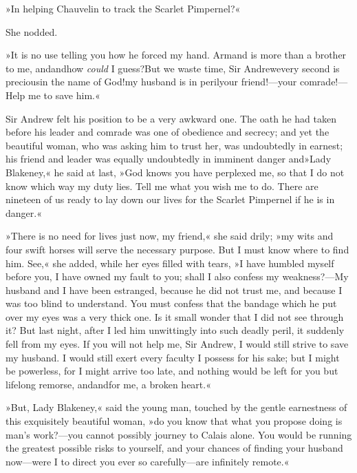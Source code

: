 »In helping Chauvelin to track the Scarlet Pimpernel?«

She nodded.

»It is no use telling you how he forced my hand. Armand is more than a brother to me, and\textellipsis \allowbreak  and\textellipsis \allowbreak  how \textit{could} I guess?\textellipsis \allowbreak  But we waste time, Sir Andrew\textellipsis \allowbreak  every second is precious\textellipsis \allowbreak  in the name of God!\textellipsis \allowbreak  my husband is in peril\textellipsis \allowbreak  your friend!—your comrade!—Help me to save him.«

Sir Andrew felt his position to be a very awkward one. The oath he had taken before his leader and comrade was one of obedience and secrecy; and yet the beautiful woman, who was asking him to trust her, was undoubtedly in earnest; his friend and leader was equally undoubtedly in imminent danger and\textellipsis \allowbreak  »Lady Blakeney,« he said at last, »God knows you have perplexed me, so that I do not know which way my duty lies. Tell me what you wish me to do. There are nineteen of us ready to lay down our lives for the Scarlet Pimpernel if he is in danger.«

»There is no need for lives just now, my friend,« she said drily; »my wits and four swift horses will serve the necessary purpose. But I must know where to find him. See,« she added, while her eyes filled with tears, »I have humbled myself before you, I have owned my fault to you; shall I also confess my weakness?—My husband and I have been estranged, because he did not trust me, and because I was too blind to understand. You must confess that the bandage which he put over my eyes was a very thick one. Is it small wonder that I did not see through it? But last night, after I led him unwittingly into such deadly peril, it suddenly fell from my eyes. If you will not help me, Sir Andrew, I would still strive to save my husband. I would still exert every faculty I possess for his sake; but I might be powerless, for I might arrive too late, and nothing would be left for you but lifelong remorse, and\textellipsis \allowbreak  and\textellipsis \allowbreak  for me, a broken heart.«

»But, Lady Blakeney,« said the young man, touched by the gentle earnestness of this exquisitely beautiful woman, »do you know that what you propose doing is man's work?—you cannot possibly journey to Calais alone. You would be running the greatest possible risks to yourself, and your chances of finding your husband now—were I to direct you ever so carefully—are infinitely remote.«

